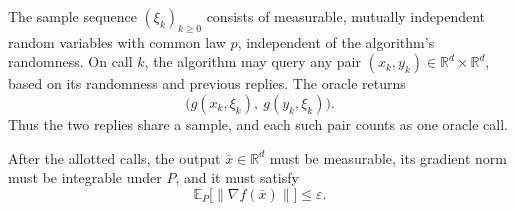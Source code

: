 \documentclass[10pt]{article}
\theoremstyle{definition}
\begin{document}
The sample sequence $(\xi_k)_{k\geq0}$ consists of measurable, mutually independent random variables with common law $p$, independent of the algorithm's randomness. On call $k$, the algorithm may query any pair $(x_k,y_k)\in\mathbb{R}^d\times\mathbb{R}^d$, based on its randomness and previous replies. The oracle returns
\[
\bigl(g(x_k,\xi_k),\ g(y_k,\xi_k)\bigr).
\]
Thus the two replies share a sample, and each such pair counts as one oracle call.

After the allotted calls, the output $\bar{x}\in\mathbb{R}^d$ must be measurable, its gradient norm must be integrable under $P$, and it must satisfy
\[
\mathbb{E}_{P}\bigl[\|\nabla f(\bar{x})\|\bigr]\leq\varepsilon.
\]
\end{document}
